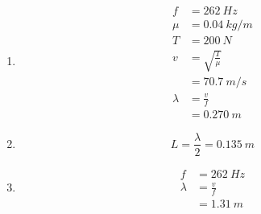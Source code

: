 \documentclass{article}
\begin{document}
\subsection{}

\begin{enumerate}
  \item

        \begin{align*}
          f       & = \qty{262}{Hz}        \\
          \mu     & = \qty{0.04}{kg/m}     \\
          T       & = \qty{200}{N}         \\
          v       & = \sqrt{\frac{T}{\mu}} \\
                  & = \qty{70.7}{m/s}      \\
          \lambda & = \frac{v}{f}          \\
                  & = \qty{0.270}{m}
        \end{align*}

  \item \[L = \frac{\lambda}{2} = \qty{0.135}{m}\]

  \item

        \begin{align*}
          f       & = \qty{262}{Hz} \\
          \lambda & = \frac{v}{f}   \\
                  & = \qty{1.31}{m}
        \end{align*}
\end{enumerate}

\subsection{}
\end{document}
